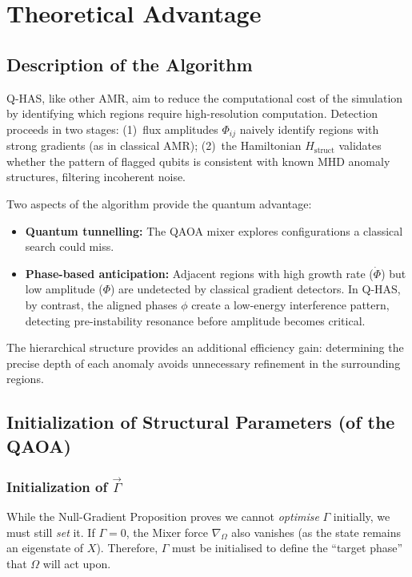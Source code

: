 \documentclass[12pt, a4paper, oneside]{report}
\begin{document}
\chapter{Theoretical Advantage}
\label{chap:theory}
\section{Description of the Algorithm}

Q-HAS, like other AMR, aim to reduce the computational cost of the simulation by identifying which regions require high-resolution computation. Detection proceeds in two stages: (1)~flux amplitudes $\Phi_{ij}$ naively identify regions with strong gradients (as in classical AMR); (2)~the Hamiltonian $H_{\text{struct}}$ validates whether the pattern of flagged qubits is consistent with known MHD anomaly structures, filtering incoherent noise.

Two aspects of the algorithm provide the quantum advantage:
\begin{itemize}
    \item \textbf{Quantum tunnelling:} The QAOA mixer explores configurations a classical search could miss.
    \item \textbf{Phase-based anticipation:} Adjacent regions with high growth rate ($\dot{\Phi}$) but low amplitude ($\Phi$) are undetected by classical gradient detectors. In Q-HAS, by contrast, the aligned phases $\phi$ create a low-energy interference pattern, detecting pre-instability resonance before amplitude becomes critical.
\end{itemize}

The hierarchical structure provides an additional efficiency gain: determining the precise depth of each anomaly avoids unnecessary refinement in the surrounding regions.

\section{Initialization of Structural Parameters (of the QAOA)}
\label{sec:initialization}
\subsection{Initialization of $\vec{\Gamma}$}

While the Null-Gradient Proposition proves we cannot \textit{optimise} $\Gamma$ initially, we must still \textit{set} it. If $\Gamma=0$, the Mixer force $\nabla_\Omega$ also vanishes (as the state remains an eigenstate of $X$). Therefore, $\Gamma$ must be initialised to define the ``target phase'' that $\Omega$ will act upon.
\end{document}
